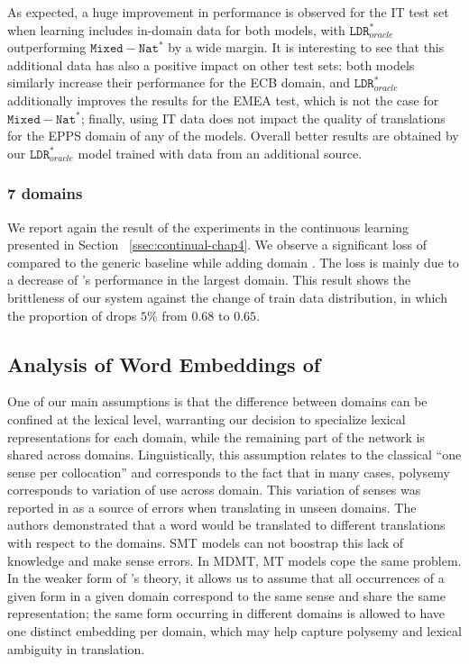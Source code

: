 As expected, a huge improvement in performance is observed for the IT test set when learning includes in-domain data for both models, with $\mathtt{LDR}_{oracle}^*$ outperforming $\mathtt{Mixed-Nat}^*$ by a wide margin.
%
It is interesting to see that this additional data has also a positive impact on other test sets: both models similarly increase their performance for the ECB domain, and $\mathtt{LDR}_{oracle}^*$ additionally improves the results for the EMEA test, which is not the case for $\mathtt{Mixed-Nat}^*$;
finally, using IT data does not impact the quality of translations for the EPPS domain of any of the models. Overall better results are obtained by our $\mathtt{LDR}_{oracle}^*$ model trained with data from an additional source.

\subsubsection{7 domains}
We report again the result of the experiments in the continuous learning presented in Section ~\ref{ssec:continual-chap4}. We observe a significant loss of  compared to the generic baseline  while adding domain . The loss is mainly due to a decrease of 's performance in the largest  domain. This result shows the brittleness of our system against the change of train data distribution, in which the proportion of  drops $5\%$ from $0.68$ to $0.65$.

\subsection{Analysis of Word Embeddings of  \label{ssec:word_embeddings-chap5}}
One of our main assumptions is that the difference between domains can be confined at the lexical level, warranting our decision to specialize lexical representations for each domain, while the remaining part of the network is shared across domains. Linguistically, this assumption relates to the classical ``one sense per collocation'' \citep{Yarowsky93onesense} and corresponds to the fact that in many cases, polysemy corresponds to variation of use across domain. This variation of senses was reported in \citet{Carpuat13domain} as a source of errors when translating in unseen domains. The authors demonstrated that a word would be translated to different translations with respect to the domains. SMT models can not boostrap this lack of knowledge and make sense errors. In MDMT, MT models cope the same problem. In the weaker form of \citep{Yarowsky93onesense}'s theory, it allows us to assume that all occurrences of a given form in a given domain correspond to the same sense and share the same representation; the same form occurring in different domains is allowed to have one distinct embedding per domain, which may help capture polysemy and lexical ambiguity in translation. 

